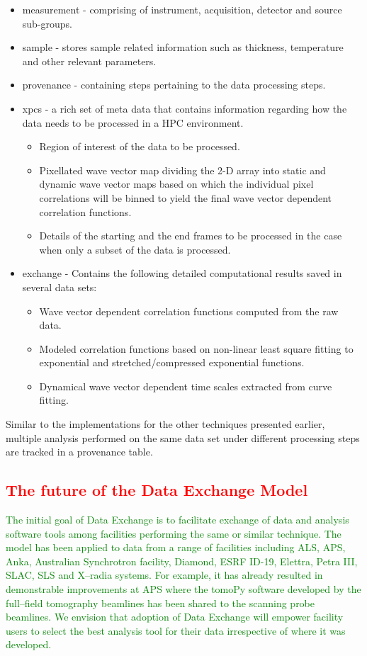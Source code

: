\documentclass[pdf]{iucr}              %
\begin{document}
\begin{itemize}
\item measurement - comprising of instrument, acquisition, detector and source sub-groups.
\item sample - stores sample related information such as thickness, temperature and other relevant parameters.
\item provenance - containing steps pertaining to the data processing steps.
\item xpcs - a rich set of meta data that contains information regarding how the data needs to be processed in a HPC environment.
	\begin{itemize}
	\item Region of interest of the data to be processed.
	\item Pixellated wave vector map dividing the 2-D array into static and dynamic wave vector maps based on which the individual pixel correlations will be binned to yield the final wave vector dependent correlation functions.
	\item Details of the starting and the end frames to be processed in the case when only a subset of the data is processed.
	\end{itemize}

\item exchange - Contains the following detailed computational results saved in several data sets:
	\begin{itemize}
		\item Wave vector dependent correlation functions computed from the raw data.
		\item Modeled correlation functions based on non-linear least square fitting to exponential and stretched/compressed exponential functions.
		\item Dynamical wave vector dependent time scales extracted from curve fitting.
	\end{itemize}
\end{itemize}

Similar to the implementations for the other techniques presented earlier, multiple analysis performed on the same data set under different processing steps are tracked in a provenance table.

\textcolor{red}{\section{The future of the Data Exchange Model}}

\textcolor{green}{The initial goal of Data Exchange is to facilitate exchange of data and analysis software tools among facilities performing the same or similar technique. The model has been applied to data from a range of facilities including ALS, APS, Anka, Australian Synchrotron facility, Diamond, ESRF ID-19, Elettra, Petra III, SLAC, SLS and X--radia systems. For example, it has already resulted in demonstrable improvements at APS where the tomoPy software developed by the full--field tomography beamlines has been shared to the scanning probe beamlines. We envision that adoption of Data Exchange will empower facility users to select the best analysis tool for their data irrespective of where it was developed.}
\end{document}
